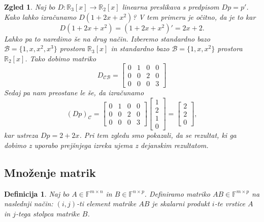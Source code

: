 \documentclass[10pt, a4paper]{article}
\newtheorem{defi}{Definicija}[section]
\newenvironment{noticeB}{%
  \tcolorbox[%
  notitle,
  empty,
  enhanced,  %
  breakable,
  coltext=black,
  colback=white, 
  fontupper=\rmfamily,
  parbox=false,
  noparskip,
  sharp corners,
  boxrule=-1pt,  %
  frame hidden,
  left=7pt,  %
  right=7pt,
  top=5pt,
  bottom=5pt,
  before skip=2.5ex plus 2pt,
  after skip=2.5ex plus 2pt,
  borderline west = {1.5pt}{-0.1pt}{blue!30!black}, %
  overlay unbroken and last={%
    \draw[color=black, line width=1.25pt]
    ($(frame.south west)+(1.pt, -0.1pt)$) -- ++(2em, 0);
  }
  ]}
{\endtcolorbox}
\newenvironment{definicija}{\begin{defi}\begin{noticeB}}{%
    \end{noticeB}\end{defi}}
\newtheorem{zgled}{Zgled}[section]
\newcommand{\R}{\mathbb {R}}
\newcommand{\F}{\mathbb {F}}
\begin{document}
\begin{zgled}
    Naj bo $D: \R_3[x] \rightarrow \R_2[x]$ linearna preslikava s predpisom $Dp = p'$.
    Kako lahko izračunamo $D(1+ 2x + x^2)$?
    V tem primeru je očitno, da je to kar $$D(1+ 2x + x^2) = (1+ 2x + x^2)' = 2x + 2.$$
    Lahko pa to naredimo še na drug način.
    Izberemo standardno bazo $\mathcal{B} = \{1, x, x^2, x^3\}$ prostora $\R_3 [x]$ in standardno bazo $\mathcal{B} = \{1, x, x^2\}$ prostora $\R_2 [x]$.
    Tako dobimo matriko
    \begin{equation*}
        D_\mathcal{CB} = \begin{bmatrix}
            0 & 1 & 0 & 0\\
            0 & 0 & 2 & 0\\
            0 & 0 & 0 & 3
        \end{bmatrix}
    \end{equation*}
    Sedaj pa nam preostane le še, da izračunamo  
    \begin{equation*}
        (Dp)_\mathcal{C} = \begin{bmatrix}
            0 & 1 & 0 & 0\\
            0 & 0 & 2 & 0\\
            0 & 0 & 0 & 3
        \end{bmatrix} \begin{bmatrix}
            1\\ 2\\ 1\\ 0
        \end{bmatrix} = \begin{bmatrix}
            2\\ 2\\ 0
        \end{bmatrix},
    \end{equation*} 
    kar ustreza $Dp = 2 + 2x$. Pri tem zgledu smo pokazali, da se rezultat, ki ga dobimo z uporabo prejšnjega izreka ujema z dejanskim rezultatom.
\end{zgled}

\subsection{Množenje matrik}

\begin{definicija}
    Naj bo $A \in \F^{m \times n}$ in $B \in \F^{n \times p}$. 
    Definiramo matriko $AB \in \F^{m \times p}$ na naslednji način:
    $(i,j)$-ti element matrike $AB$ je skalarni produkt $i$-te vrstice $A$ in $j$-tega stolpca matrike $B$.
\end{definicija}
\end{document}
